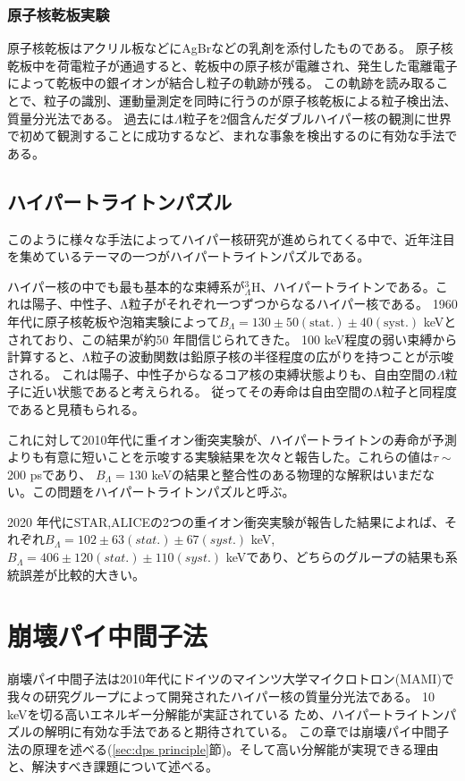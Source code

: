 \documentclass[a4paper,11pt,uplatex]{jsbook}
\begin{document}
\subsubsection{原子核乾板実験}
原子核乾板はアクリル板などにAgBrなどの乳剤を添付したものである。
原子核乾板中を荷電粒子が通過すると、乾板中の原子核が電離され、発生した電離電子によって乾板中の銀イオンが結合し粒子の軌跡が残る。
この軌跡を読み取ることで、粒子の識別、運動量測定を同時に行うのが原子核乾板による粒子検出法、質量分光法である。
過去には$\Lambda$粒子を2個含んだダブルハイパー核の観測に世界で初めて観測することに成功するなど\cite{takahashi2001}、まれな事象を検出するのに有効な手法である。

\subsection{ハイパートライトンパズル}\label{sec:hypertriton puzzle}
このように様々な手法によってハイパー核研究が進められてくる中で、近年注目を集めているテーマの一つがハイパートライトンパズルである。

ハイパー核の中でも最も基本的な束縛系が$^3_{\Lambda}\text{H}$、ハイパートライトンである。これは陽子、中性子、Λ粒子がそれぞれ一つずつからなるハイパー核である。
1960年代に原子核乾板や泡箱実験によって$B_{\Lambda} = 130 \pm 50(\text{stat.}) \pm 40(\text{syst.})$ keVとされており\cite{Juric}、この結果が約50 年間信じられてきた。
100 keV程度の弱い束縛から計算すると、Λ粒子の波動関数は鉛原子核の半径程度の広がりを持つことが示唆される。
これは陽子、中性子からなるコア核の束縛状態よりも、自由空間の$\Lambda$粒子に近い状態であると考えられる。%
従ってその寿命は自由空間のΛ粒子と同程度であると見積もられる。

これに対して2010年代に重イオン衝突実験が、ハイパートライトンの寿命が予測よりも有意に短いことを示唆する実験結果を次々と報告した\cite{HI-1,HI-2,HI-3,HI-4}。これらの値は$\tau \sim$200 psであり、
$B_{\Lambda} = 130$ keVの結果と整合性のある物理的な解釈はいまだない。この問題をハイパートライトンパズルと呼ぶ。

2020 年代にSTAR,ALICEの2つの重イオン衝突実験が報告した結果によれば、それぞれ$B_{\Lambda}= 102 \pm 63(stat.) \pm 67(syst.)$ keV\cite{STAR}, 
$B_{\Lambda} = 406 \pm 120(stat.) \pm 110 (syst.)$ keV\cite{ALICE}であり、どちらのグループの結果も系統誤差が比較的大きい。\\

\section{崩壊パイ中間子法}\label{DPS}
崩壊パイ中間子法は2010年代にドイツのマインツ大学マイクロトロン(MAMI)で我々の研究グループによって開発されたハイパー核の質量分光法である\cite{esserObservation4Hyperhydrogen2015}。
10 keVを切る高いエネルギー分解能が実証されている\cite{Schulz2015} ため、ハイパートライトンパズルの解明に有効な手法であると期待されている。
この章では崩壊パイ中間子法の原理を述べる(\ref{sec:dps principle}節)。そして高い分解能が実現できる理由と、解決すべき課題について述べる。
\end{document}
